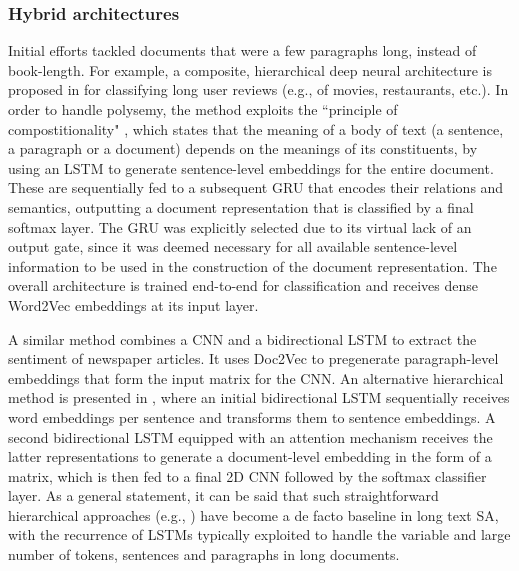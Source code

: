 \documentclass[preprint,review,10pt]{elsarticle}
\begin{document}
	\subsubsection{Hybrid architectures} 
	Initial efforts tackled documents that were a few paragraphs long, instead of book-length. For example, a composite, hierarchical deep neural architecture is proposed in \cite{tang} for classifying long user reviews (e.g., of movies, restaurants, etc.). In order to handle polysemy, the method exploits the ``principle of compostitionality" \cite{francis}, which states that the meaning of a body of text (a sentence, a paragraph or a document) depends on the meanings of its constituents, by using an LSTM to generate sentence-level embeddings for the entire document. These are sequentially fed to a subsequent GRU that encodes their relations and semantics, outputting a document representation that is classified by a final softmax layer. The GRU was explicitly selected due to its virtual lack of an output gate, since it was deemed necessary for all available sentence-level information to be used in the construction of the document representation. The overall architecture is trained end-to-end for classification and receives dense Word2Vec embeddings at its input layer.
	
	A similar method \cite{morocco} combines a CNN and a bidirectional LSTM to extract the sentiment of newspaper articles. It uses Doc2Vec \cite{doc2vec} to pregenerate paragraph-level embeddings that form the input matrix for the CNN. An alternative hierarchical method is presented in \cite{mao2022document}, where an initial bidirectional LSTM sequentially receives word embeddings per sentence and transforms them to sentence embeddings. A second bidirectional LSTM equipped with an attention mechanism receives the latter representations to generate a document-level embedding in the form of a matrix, which is then fed to a final 2D CNN followed by the softmax classifier layer. As a general statement, it can be said that such straightforward hierarchical approaches (e.g., \cite{bhuvaneshwari2022sentiment}) have become a de facto baseline in long text SA, with the recurrence of LSTMs typically exploited to handle the variable and large number of tokens, sentences and paragraphs in long documents.
	
\end{document}
